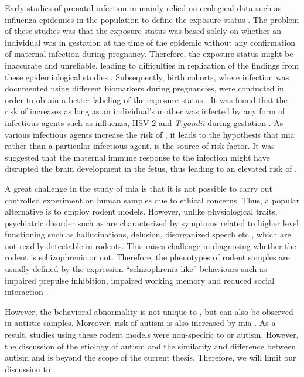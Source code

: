 	Early studies of prenatal infection in  mainly relied on ecological data such as influenza epidemics in the population to define the exposure status \citep{Brown2010}.
	The problem of these studies was that the exposure status was based solely on whether an individual was in gestation at the time of the epidemic without any confirmation of maternal infection during pregnancy.
	Therefore, the exposure status might be inaccurate and unreliable, leading to difficulties in replication of the findings from these epidemiological studies \citep{Brown2010}.  
	Subsequently, birth cohorts, where infection was documented using different biomarkers during pregnancies, were conducted in order to obtain a better labeling of the exposure status \citep{Brown2010}.
	It was found that the risk of  increases as long as an individual's mother was infected by any form of infectious agents such as influenza, HSV-2 and \textit{T.gondii} during gestation \citep{Brown2010}.
	As various infectious agents increase the risk of , it leads to the hypothesis that \gls{mia} \citep{Brown2010} rather than a particular infectious agent, is the source of risk factor. 
	It was suggested that the maternal immune response to the infection might have disrupted the brain development in the fetus, thus leading to an elevated risk of  \citep{Garbett2012a}.
	
	A great challenge in the study of \gls{mia} is that it is not possible to carry out controlled experiment on human samples due to ethical concerns.
	Thus, a popular alternative is to employ rodent models.
	However, unlike physiological traits, psychiatric disorder such as  are characterized by symptoms related to higher level functioning such as hallucinations, delusion, disorganized speech etc \citep{AmericanPsychiatricAssociation2013}, which are not readily detectable in rodents.
	This raises challenge in diagnosing whether the rodent is schizophrenic or not.
	Therefore, the phenotypes of rodent samples are usually defined by the expression ``schizophrenia-like'' behaviours such as impaired prepulse inhibition, impaired working memory and reduced social interaction \citep{Meyer2007a}.
	
	However, the behavioral abnormality is not unique to , but can also be observed in autistic samples.
	Moreover, risk of autism is also increased by \gls{mia} \citep{Brown2012}.
	As a result, studies using these rodent models were non-specific to  or autism. 
	However, the discussion of the etiology of autism and the similarity and difference between autism and  is beyond the scope of the current thesis.
	Therefore, we will limit our discussion to .
	
